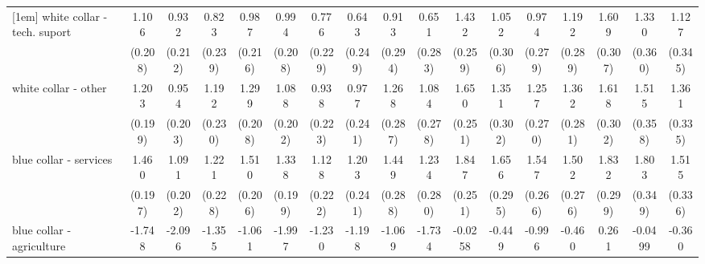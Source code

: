 {\begin{tabular}{l*{16}{c}}
[1em]
white collar - tech. suport&       1.106\sym{***}&       0.932\sym{***}&       0.823\sym{***}&       0.987\sym{***}&       0.994\sym{***}&       0.776\sym{***}&       0.643\sym{**} &       0.913\sym{**} &       0.651\sym{*}  &       1.432\sym{***}&       1.052\sym{***}&       0.974\sym{***}&       1.192\sym{***}&       1.609\sym{***}&       1.330\sym{***}&       1.127\sym{**} \\
                    &     (0.208)         &     (0.212)         &     (0.239)         &     (0.216)         &     (0.208)         &     (0.229)         &     (0.249)         &     (0.294)         &     (0.283)         &     (0.259)         &     (0.306)         &     (0.279)         &     (0.289)         &     (0.307)         &     (0.360)         &     (0.345)         \\
[1em]
white collar - other&       1.203\sym{***}&       0.954\sym{***}&       1.192\sym{***}&       1.299\sym{***}&       1.088\sym{***}&       0.938\sym{***}&       0.977\sym{***}&       1.268\sym{***}&       1.084\sym{***}&       1.650\sym{***}&       1.351\sym{***}&       1.257\sym{***}&       1.362\sym{***}&       1.618\sym{***}&       1.515\sym{***}&       1.361\sym{***}\\
                    &     (0.199)         &     (0.203)         &     (0.230)         &     (0.208)         &     (0.202)         &     (0.223)         &     (0.241)         &     (0.287)         &     (0.278)         &     (0.251)         &     (0.302)         &     (0.270)         &     (0.281)         &     (0.302)         &     (0.358)         &     (0.335)         \\
[1em]
blue collar - services&       1.460\sym{***}&       1.091\sym{***}&       1.221\sym{***}&       1.510\sym{***}&       1.338\sym{***}&       1.128\sym{***}&       1.203\sym{***}&       1.449\sym{***}&       1.234\sym{***}&       1.847\sym{***}&       1.656\sym{***}&       1.547\sym{***}&       1.502\sym{***}&       1.832\sym{***}&       1.803\sym{***}&       1.515\sym{***}\\
                    &     (0.197)         &     (0.202)         &     (0.228)         &     (0.206)         &     (0.199)         &     (0.222)         &     (0.241)         &     (0.288)         &     (0.280)         &     (0.251)         &     (0.295)         &     (0.266)         &     (0.276)         &     (0.299)         &     (0.349)         &     (0.336)         \\
[1em]
blue collar - agriculture&      -1.748\sym{***}&      -2.096\sym{***}&      -1.355\sym{**} &      -1.061\sym{*}  &      -1.997\sym{***}&      -1.230\sym{*}  &      -1.198\sym{**} &      -1.069\sym{*}  &      -1.734\sym{***}&     -0.0258         &      -0.449         &      -0.996         &      -0.460         &       0.261         &     -0.0499         &      -0.360         \\

\end{tabular}}
